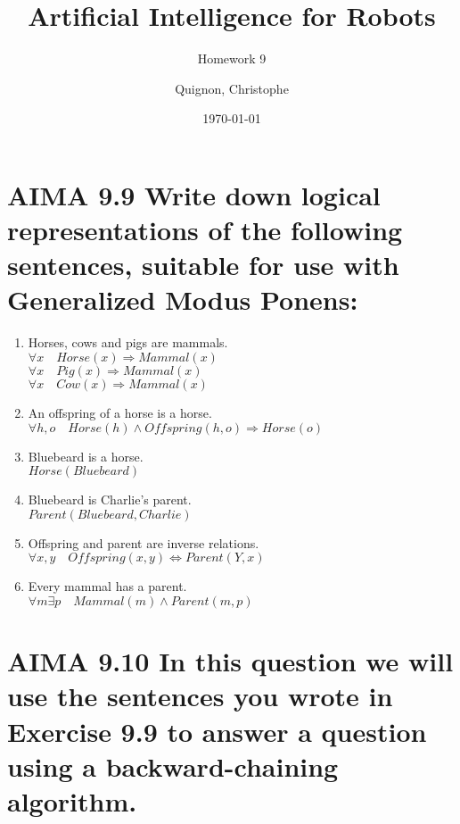 \documentclass{scrartcl}
\begin{document}
\title{Artificial Intelligence for Robots}
\subtitle{Homework 9}
\author{
  Quignon, Christophe \\
} 
\date{\today}

\maketitle{}
\section{AIMA 9.9 Write down logical representations of the following sentences, suitable for use with Generalized Modus Ponens: }

\begin{enumerate}[label={\alph*)}] 
	\item Horses, cows and pigs are mammals.\\
	$\forall x \quad Horse(x) \Rightarrow Mammal(x) $\\
	$\forall x \quad Pig(x) \Rightarrow Mammal(x) $\\
	$\forall x \quad Cow(x) \Rightarrow Mammal(x) $
	\item An offspring of a horse is a horse.\\
	$\forall h, o \quad Horse(h) \land Offspring(h, o) \Rightarrow Horse(o) $
	\item Bluebeard is a horse.\\
	$Horse(Bluebeard)$
	\item Bluebeard is Charlie’s parent.\\
	$Parent(Bluebeard, Charlie)$
	\item Offspring and parent are inverse relations.\\
	$\forall x, y \quad Offspring(x, y) \iff Parent(Y, x)$
	\item Every mammal has a parent.\\
	$\forall m \exists p \quad Mammal(m) \land Parent(m, p)$
\end{enumerate}

\section{ AIMA 9.10 In this question we will use the sentences you wrote in Exercise 9.9 to answer a question using a backward-chaining algorithm.}
\end{document}
